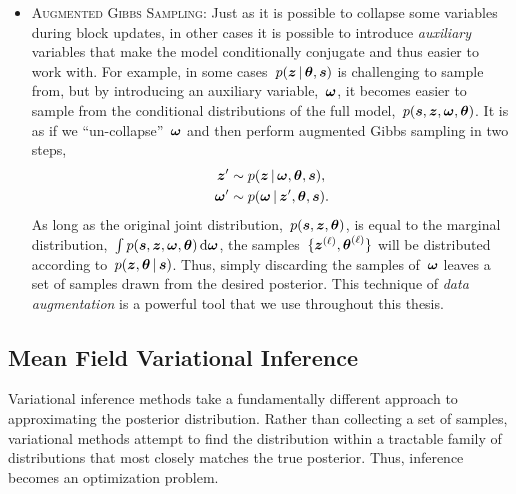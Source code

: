 \begin{itemize}
\item \textsc{Augmented Gibbs Sampling}: Just as it is possible to
  collapse some variables during block updates, in other cases it is
  possible to introduce \emph{auxiliary} variables that make the
  model conditionally conjugate and thus easier to work with. 
  For example, in some cases~$p(\boldsymbol{z} \,|\, \boldsymbol{\theta}, \boldsymbol{s})$ is
  challenging to sample from, but by introducing an auxiliary
  variable,~$\boldsymbol{\omega}$, it becomes easier to sample from the conditional
  distributions of the full model,~$p(\boldsymbol{s}, \boldsymbol{z}, \boldsymbol{\omega}, \boldsymbol{\theta})$.
  It is as if we ``un-collapse''~$\boldsymbol{\omega}$
  and then perform augmented Gibbs sampling in two steps,
  \begin{align*}
    \boldsymbol{z}' &\sim p(\boldsymbol{z} \,|\, \boldsymbol{\omega}, \boldsymbol{\theta}, \boldsymbol{s}), \\
    \boldsymbol{\omega}' &\sim p(\boldsymbol{\omega} \,|\, \boldsymbol{z}', \boldsymbol{\theta}, \boldsymbol{s}).
  \end{align*}
  As long as the original joint distribution,~$p(\boldsymbol{s}, \boldsymbol{z}, \boldsymbol{\theta})$,
  is equal to the marginal distribution,~${\int p(\boldsymbol{s}, \boldsymbol{z}, \boldsymbol{\omega},
    \boldsymbol{\theta}) \, \mathrm{d}\boldsymbol{\omega}}$, the samples~${\{\boldsymbol{z}^{(\ell)},
    \boldsymbol{\theta}^{(\ell)}\}}$ will be distributed according to~$p(\boldsymbol{z},
  \boldsymbol{\theta} \,|\, \boldsymbol{s})$.  Thus, simply discarding the samples
  of~$\boldsymbol{\omega}$ leaves a set of samples drawn from the desired
  posterior.  This technique of \emph{data augmentation} is a powerful
  tool that we use throughout this thesis.
\end{itemize}


\subsection{Mean Field Variational Inference}
Variational inference methods \citep{jordan1999introduction,
  wainwright2008graphical} take a fundamentally different approach to
approximating the posterior distribution. Rather than collecting a set
of samples, variational methods attempt to find the distribution
within a tractable family of distributions that most closely matches
the true posterior. Thus, inference becomes an optimization problem.

